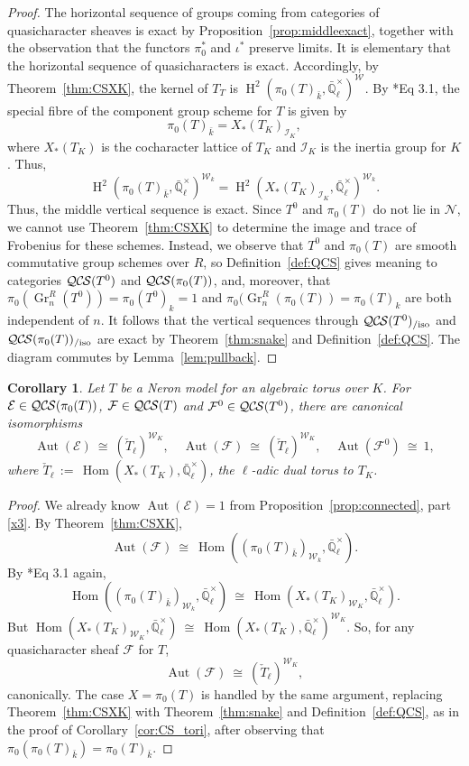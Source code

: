 \documentclass[10pt]{amsart}
\theoremstyle{plain}
\newtheorem{corollary}[theorem]{Corollary}
\theoremstyle{definition}
\newcommand{\EE}{\mathbb{\bar Q}_\ell}
\newcommand{\bFq}{\bar{k}}
\newcommand{\Fq}{k}
\newcommand{\EEx}{\EE^\times}
\newcommand{\Weil}[1]{\mathcal{W}_{#1}}
\DeclareMathOperator{\Aut}{Aut}
\DeclareMathOperator{\Hom}{Hom}
\DeclareMathOperator{\Gr}{Gr}
\DeclareMathOperator{\Hh}{H}
\newcommand{\ceq}{{\, :=\, }}
\newcommand{\iso}{{\ \cong\ }}
\newcommand{\TrFrob}[1]{T_{#1}}
\newcommand{\cs}[1]{{\mathcal{#1}}}
\newcommand{\QCS}{{\mathcal{QC\hskip-0.8pt S}}}
\newcommand{\QCSiso}[1]{\QCS(#1)_{/\text{iso}}}
\begin{document}
\begin{proof} 
The horizontal sequence of groups coming from categories of quasicharacter sheaves is exact by Proposition~\ref{prop:middleexact}, together with the observation that the functors $\pi_0^*$ and $\iota^*$ preserve limits.
It is elementary that the horizontal sequence of quasicharacters is exact.
Accordingly, by Theorem~\ref{thm:CSXK}, the kernel of $\TrFrob{T}$ is $\Hh^2(\pi_0(T)_{\bFq},\EEx)^{\Weil{}}$. 
By \cite{bitan:discriminant}*{Eq 3.1}, the special fibre of the component group scheme for $T$ is given by
\[
 \pi_0(T)_{\bFq} = X_*(T_K)_{\mathcal{I}_K},
\]
where $X_*(T_K)$ is the cocharacter lattice of $T_K$ and $\mathcal{I}_K$ is the inertia group for $K$.
Thus,
\[
\Hh^2(\pi_0(T)_{\bFq},\EEx)^{\Weil{\Fq}} = \Hh^2(X_*(T_K)_{\mathcal{I}_K},\EEx)^{\Weil{\Fq}}.
\] 
Thus, the middle vertical sequence is exact.
Since $T^0$ and $\pi_0(T)$ do not lie in $\mathcal{N}$, we cannot use Theorem~\ref{thm:CSXK} to determine the image and trace of Frobenius for these schemes. 
Instead, we observe that $T^0$ and $\pi_0(T)$ are smooth commutative group schemes over $R$, so Definition~\ref{def:QCS} gives meaning to categories $\QCS(T^0)$ and $\QCS(\pi_0(T))$, and, moreover, that $\pi_0(\Gr^R_n(T^0))= \pi_0(T^0)_{\Fq} = 1$ and $\pi_0(\Gr^R_n(\pi_0(T)) = \pi_0(T)_{\Fq}$ are both independent of $n$.
It follows that the vertical sequences through $\QCSiso{T^0}$ and $\QCSiso{\pi_0(T)}$ are exact by Theorem~\ref{thm:snake} and Definition~\ref{def:QCS}.
The diagram commutes by Lemma~\ref{lem:pullback}.
\end{proof}

\begin{corollary}
Let $T$ be a Neron model for an algebraic torus over $K$.
For $\cs{E}\in \QCS(\pi_0(T))$, $\cs{F}\in {\QCS(T)}$ and $\cs{F}^0\in {\QCS(T^0)}$, there are canonical isomorphisms
\[
\Aut(\cs{E})\iso (\check{T}_\ell)^{\Weil{K}},
\quad
\Aut(\cs{F})\iso (\check{T}_\ell)^{\Weil{K}},
\quad
\Aut(\cs{F}^0)\iso 1,
\]
 where $\check{T}_\ell \ceq \Hom(X_*(T_K),\EEx)$, the $\ell$-adic dual torus to $T_K$.
\end{corollary}

\begin{proof}
We already know $\Aut(\cs{E}) =1$ from Proposition~\ref{prop:connected}, part \ref{x3}.
By Theorem~\ref{thm:CSXK}, 
\[
\Aut(\cs{F})  \iso \Hom((\pi_0(T)_{\bFq})_{\Weil{\Fq}},\EEx).
\]
By \cite{bitan:discriminant}*{Eq 3.1} again, 
\[
\Hom((\pi_0(T)_{\bFq})_{\Weil{\Fq}},\EEx) \iso
\Hom(X_*(T_K)_{\Weil{K}},\EEx).
\]
But $\Hom(X_*(T_K)_{\Weil{K}},\EEx) \iso \Hom(X_*(T_K),\EEx)^{\Weil{K}}$.
So, for any quasicharacter sheaf $\cs{F}$ for $T$,
\[
\Aut(\cs{F}) \iso (\check{T}_\ell)^{\Weil{K}},
\]
canonically.
The case $X= \pi_0(T)$ is handled by the same argument, replacing Theorem~\ref{thm:CSXK} with Theorem~\ref{thm:snake} and Definition~\ref{def:QCS}, as in the proof of Corollary~\ref{cor:CS_tori}, after observing that $\pi_0(\pi_0(T)_{\bFq}) = \pi_0(T)_{\bFq}$.
\end{proof}
\end{document}
